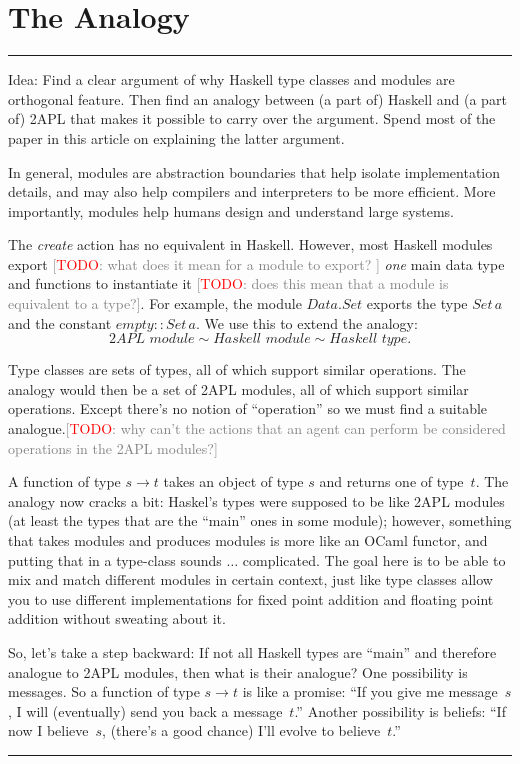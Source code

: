\documentclass[conference,compsoc]{IEEEtran}
\newcommand{\todo}[1]{{\small \textcolor{gray}{[\textcolor{red}{TODO}: #1]}}}
\newenvironment{notes}{\medskip\hrule\nobreak\smallskip\narrower}{\smallskip\hrule\medskip}
\begin{document}
\section{The Analogy}

\begin{notes}
Idea: Find a clear argument of why Haskell type classes and modules are
orthogonal feature. Then find an analogy between (a part of) Haskell and (a
part of) 2APL that makes it possible to carry over the argument. Spend most
of the paper in this article on explaining the latter argument.

In general, modules are abstraction boundaries that help isolate
implementation details, and may also help compilers and interpreters to be
more efficient.  More importantly, modules help humans design and
understand large systems.

The \textit{create} action has no equivalent in Haskell. However, most
Haskell modules export \todo{what does it mean for a module to export?  }
\emph{one} main data type and functions to instantiate it \todo{does this
mean that a module is equivalent to a type?}.  For example, the module
$\mathit{Data}.\mathit{Set}$ exports the type $\mathit{Set}\,a$ and the
constant $\mathit{empty}::\mathit{Set}\,a$. We use this to extend the
analogy: \[ \textit{2APL module} \sim \textit{Haskell module} \sim
\textit{Haskell type}. \]

Type classes are sets of types, all of which support similar operations.
The analogy would then be a set of 2APL modules, all of which support
similar operations. Except there's no notion of ``operation'' so we must
find a suitable analogue.\todo{why can't the actions that an agent can
perform  be considered operations in the 2APL modules?}

A function of type $s\to t$ takes an object of type $s$ and returns one of
type~$t$. The analogy now cracks a bit: Haskel's types were supposed to be
like 2APL modules (at least the types that are the ``main'' ones in some
module); however, something that takes modules and produces modules is more
like an OCaml functor, and putting that in a type-class sounds $\ldots$
complicated. The goal here is to be able to mix and match different modules
in certain context, just like type classes allow you to use different
implementations for fixed point addition and floating point addition
without sweating about it.

So, let's take a step backward: If not all Haskell types are ``main'' and
therefore analogue to 2APL modules, then what is their analogue? One
possibility is messages. So a function of type $s\to t$ is like a promise:
``If you give me message~$s$, I will (eventually) send you back a
message~$t$.'' Another possibility is beliefs: ``If now I believe~$s$,
(there's a good chance) I'll evolve to believe~$t$.''

\end{notes}
\end{document}
